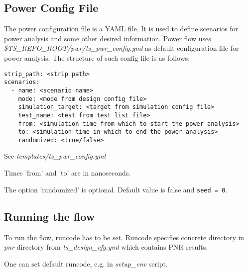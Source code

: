 \documentclass{tropic_design_spec}
\begin{document}
\pagebreak


\subsection{Power Config File}

The power configuration file is a YAML file. It is used to define scenarios for power analysis and some
other desired information. Power flow uses \textit{\$TS_REPO_ROOT/pwr/ts_pwr_config.yml} as default
configuration file for power analysis. The structure of such config file is as follows:

\begin{lstlisting}
strip_path: <strip path>
scenarios:
  - name: <scenario name>
    mode: <mode from design config file>
    simulation_target: <target from simulation config file>
    test_name: <test from test list file>
    from: <simulation time from which to start the power analysis>
    to: <simulation time in which to end the power analysis>
    randomized: <true/false>
\end{lstlisting}

See \textit{templates/ts_pwr_config.yml}

\vspace{.5cm}

Times 'from' and 'to' are in nanoseconds.

\vspace{.5cm}

The option 'randomized' is optional. Default value is false and \texttt{seed = 0}.

\subsection{Running the flow}

To run the flow, runcode has to be set. Runcode specifies concrete directory in \textit{pnr} directory
from \textit{ts_design_cfg.yml} which contains PNR results.

\vspace{.5cm}

One can set default runcode, e.g. in \textit{setup_env} script.

\vspace{.5cm}
\end{document}
